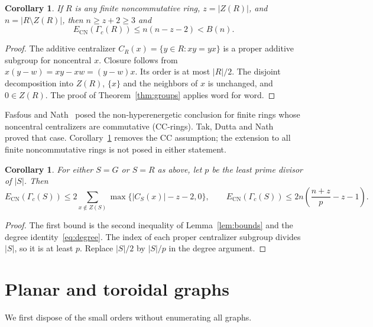 \documentclass[11pt]{article}
\newtheorem{corollary}[theorem]{Corollary}
\newcommand{\ECN}{E_{\mathrm{CN}}}
\begin{document}
\begin{corollary}\label{cor:rings}
If $R$ is any finite noncommutative ring, $z=|Z(R)|$, and
$n=|R\setminus Z(R)|$, then $n\ge z+2\ge3$ and
\[
 \ECN(\Gamma_c(R))\le n(n-z-2)<B(n).
\]
\end{corollary}
\begin{proof}
The additive centralizer $C_R(x)=\{y\in R:xy=yx\}$ is a proper
additive subgroup for noncentral $x$. Closure follows from
$x(y-w)=xy-xw=(y-w)x$. Its order is at most $|R|/2$.
The disjoint decomposition into $Z(R)$, $\{x\}$ and the neighbors of
$x$ is unchanged, and $0\in Z(R)$. The proof of
Theorem~\ref{thm:groups} applies word for word.
\end{proof}
Fasfous and Nath~\cite[Conjecture~3.12, p.~75]{FN} posed the
non-hyperenergetic conclusion for finite rings whose noncentral
centralizers are commutative (CC-rings). Tak, Dutta and
Nath~\cite[Corollary~5.5, p.~15]{TDN} proved that case.
Corollary~\ref{cor:rings} removes the CC assumption; the extension to
all finite noncommutative rings is not posed in either statement.

\begin{corollary}\label{cor:prime}
For either $S=G$ or $S=R$ as above, let $p$ be the least prime divisor
of $|S|$. Then
\[
 \ECN(\Gamma_c(S))\le
 2\sum_{x\notin Z(S)}\max\{|C_S(x)|-z-2,0\},\qquad
 \ECN(\Gamma_c(S))\le2n\left(\frac{n+z}{p}-z-1\right).
\]
\end{corollary}
\begin{proof}
The first bound is the second inequality of Lemma~\ref{lem:bounds}
and the degree identity~\eqref{eq:degree}.
The index of each proper centralizer subgroup divides $|S|$, so it
is at least $p$. Replace $|S|/2$ by $|S|/p$ in the degree argument.
\end{proof}

\section{Planar and toroidal graphs}
We first dispose of the small orders without enumerating all graphs.
\end{document}
